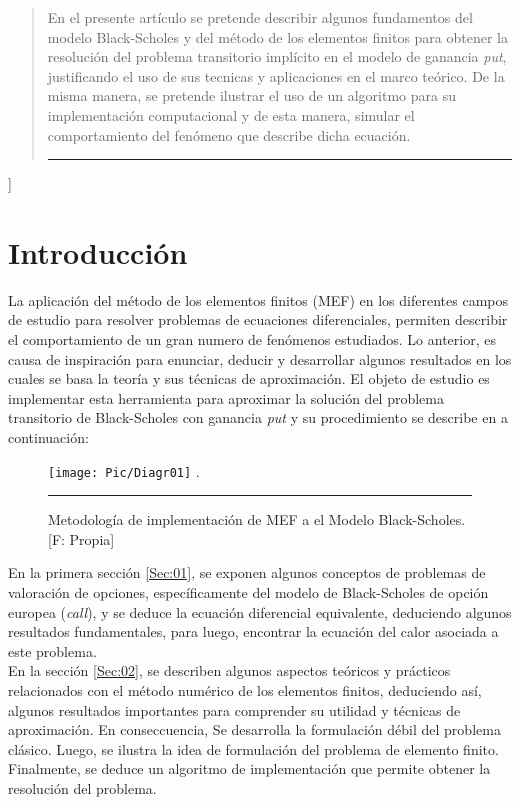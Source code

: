 \documentclass[12pt]{article}
\begin{document}
\begin{@twocolumnfalse}
\begin{abstract}
En el presente artículo se pretende describir algunos fundamentos del modelo Black-Scholes y del método de los elementos finitos para obtener la resolución del problema transitorio implícito en el modelo de ganancia \textit{put}, justificando el uso de sus tecnicas y aplicaciones en el marco teórico. De la misma manera, se pretende ilustrar el uso de un algoritmo para su implementación computacional y de esta manera, simular el comportamiento del fenómeno que describe dicha ecuación. 

     
\begin{center} \rule{0.9\textwidth}{0.1mm} \end{center}
\vspace*{0.3cm}
\end{abstract}

\end{@twocolumnfalse}]


\section*{Introducci\'on}
La aplicación del método de los elementos finitos (MEF) en los diferentes campos de estudio para resolver problemas de ecuaciones diferenciales, permiten describir el comportamiento de un gran numero de fenómenos estudiados. Lo anterior,  es causa de inspiración para enunciar, deducir y desarrollar algunos resultados en los cuales se basa la teoría y sus técnicas de aproximación. El objeto de estudio es implementar esta herramienta para aproximar la solución del problema transitorio de Black-Scholes con ganancia \textit{put} y su procedimiento se describe en a continuación:
\begin{figure}[h] 
	\centering	
	\texttt{[image: Pic/Diagr01]} 
	\label{Diagrama01}.
	\caption{Metodología de implementación de MEF a el Modelo Black-Scholes. [F: Propia]}
	\hrule
\end{figure}
 
 En la primera sección \ref{Sec:01}, se exponen algunos conceptos de problemas de valoración de opciones, específicamente del modelo de Black-Scholes de opción europea (\textit{call}), y se deduce la ecuación diferencial equivalente, deduciendo algunos resultados fundamentales, para luego, encontrar la ecuación del calor asociada a este problema.\\
 
 En la sección \ref{Sec:02}, se describen algunos aspectos teóricos y prácticos relacionados con el método numérico de los elementos finitos, deduciendo así, algunos resultados importantes para comprender su utilidad y técnicas de aproximación. En conseccuencia, Se desarrolla la formulación débil del problema clásico. Luego, se ilustra la idea de formulación del problema de elemento finito. Finalmente, se deduce un algoritmo de implementación que permite obtener la resolución del problema. 
 
\end{document}

